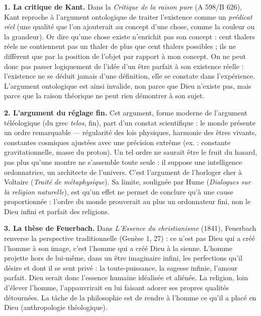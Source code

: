 \documentclass[11pt]{article}
\begin{document}
\begin{corrige}
\textbf{1. La critique de Kant.} Dans la \emph{Critique de la raison pure} (A 598/B 626), Kant reproche à l'argument ontologique de traiter l'existence comme un \emph{prédicat réel} (une qualité que l'on ajouterait au concept d'une chose, comme la couleur ou la grandeur). Or dire qu'une chose existe n'enrichit pas son concept : cent thalers réels ne contiennent pas un thaler de plus que cent thalers possibles ; ils ne diffèrent que par la position de l'objet par rapport à mon concept. On ne peut donc pas passer logiquement de l'idée d'un être parfait à son existence réelle : l'existence ne se déduit jamais d'une définition, elle se constate dans l'expérience. L'argument ontologique est ainsi invalide, non parce que Dieu n'existe pas, mais parce que la raison théorique ne peut rien démontrer à son sujet.

\textbf{2. L'argument du réglage fin.} Cet argument, forme moderne de l'argument téléologique (du grec \emph{telos}, fin), part d'un constat scientifique : le monde présente un ordre remarquable — régularité des lois physiques, harmonie des êtres vivants, constantes cosmiques ajustées avec une précision extrême (ex. : constante gravitationnelle, masse du proton). Un tel ordre ne saurait être le fruit du hasard, pas plus qu'une montre ne s'assemble toute seule : il suppose une intelligence ordonnatrice, un architecte de l'univers. C'est l'argument de l'horloger cher à Voltaire (\emph{Traité de métaphysique}). Sa limite, soulignée par Hume (\emph{Dialogues sur la religion naturelle}), est qu'un effet ne permet de conclure qu'à une cause proportionnée : l'ordre du monde prouverait au plus un ordonnateur fini, non le Dieu infini et parfait des religions.

\textbf{3. La thèse de Feuerbach.} Dans \emph{L'Essence du christianisme} (1841), Feuerbach renverse la perspective traditionnelle (Genèse 1, 27) : ce n'est pas Dieu qui a créé l'homme à son image, c'est l'homme qui a créé Dieu à la sienne. L'homme projette hors de lui-même, dans un être imaginaire infini, les perfections qu'il désire et dont il se sent privé : la toute-puissance, la sagesse infinie, l'amour parfait. Dieu serait donc l'essence humaine idéalisée et aliénée. La religion, loin d'élever l'homme, l'appauvrirait en lui faisant adorer ses propres qualités détournées. La tâche de la philosophie est de rendre à l'homme ce qu'il a placé en Dieu (anthropologie théologique).
\end{corrige}
\end{document}
